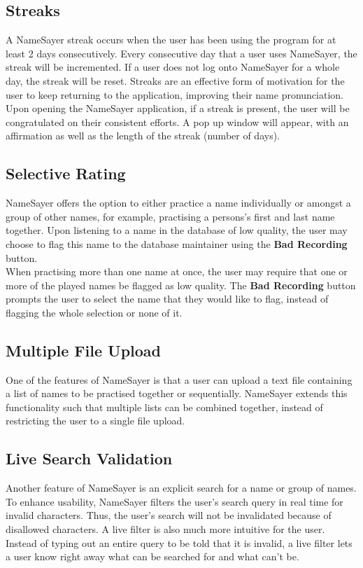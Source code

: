 \documentclass{article}
\begin{document}
\subsection{Streaks}
A NameSayer streak occurs when the user has been using the program for at least 2 days consecutively. Every consecutive day 
that a user uses NameSayer, the streak will be incremented. If a user does not log onto NameSayer for a whole day, the 
streak will be reset. Streaks are an effective form of motivation for the user to keep returning to the application, 
improving their name pronunciation. \\

Upon opening the NameSayer application, if a streak is present, the user will be congratulated on their consistent efforts.
A pop up window will appear, with an affirmation as well as the length of the streak (number of days).

\subsection{Selective Rating}
NameSayer offers the option to either practice a name individually or amongst a group of other names, for example,
practising a persons's first and last name together. Upon listening to a name in the database of low quality, the user may
choose to flag this name to the database maintainer using the \textbf{Bad Recording} button. \\

When practising more than one name
at once, the user may require that one or more of the played names be flagged as low quality. The \textbf{Bad Recording} button
prompts the user to select the name that they would like to flag, instead of flagging the whole selection or none of it.

\subsection{Multiple File Upload}
One of the features of NameSayer is that a user can upload a text file containing a list of names to be practised together or 
sequentially. NameSayer extends this functionality such that multiple lists can be combined together, instead of restricting
the user to a single file upload.

\subsection{Live Search Validation}
Another feature of NameSayer is an explicit search for a name or group of names. To enhance usability, NameSayer filters 
the user's search query in real time for invalid characters. Thus, the user's search will not be invalidated because of disallowed
characters. A live filter is also much more intuitive for the user. Instead of typing out an entire query to be told that it is invalid,
a live filter lets a user know right away what can be searched for and what can't be.
\end{document}
